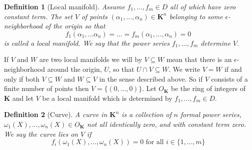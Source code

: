 \documentclass{article}
\newtheorem{definition}{Definition}[section]
\numberwithin{equation}{section}
\begin{document}
\begin{definition}[Local manifold]
    Assume $f_1, ..., f_m \in D$ all of which have zero constant term. The set $V$ of points $(\alpha_1, ..., \alpha_n) \in \bm K^n$ belonging to some $\epsilon$-neighborhood of the origin so that $$f_1(\alpha_1, ... \alpha_n) = ... = f_m(\alpha_1, ..., \alpha_n) = 0$$
    is called a local manifold. We say that the power series $f_1, ..., f_m$ determine $V$.
\end{definition}
If $V$ and $W$ are two local manifolds we will by $V \subseteq W$ mean that there is an $\epsilon$-neighborhood around the origin, $U$, so that $U \cap V \subseteq W$. We write $V = W$ if and only if both $V \subseteq W$ and $W \subseteq V$ in the sense described above. So if $V$ consists of a finite number of points then $V = \{(0,...,0)\}$. Let $O_{\bm K}$ be the ring of integers of $\bm K$ and let $V$ be a local manifold which is determined by $f_1, ..., f_m \in D$.




\begin{definition}[Curve]
    A curve in $\bm{K}^n$ is a collection of $n$ formal power series, $\omega_1(X), ..., \omega_n(X) \in O_{\bm K}$ not all identically zero, and with constant term zero. We say the curve lies on $V$ if $$f_i(\omega_1(X), ..., \omega_n(X)) = 0 \text{ for all } i \in \{1, ..., m \}$$
\end{definition}

% 
\end{document}
